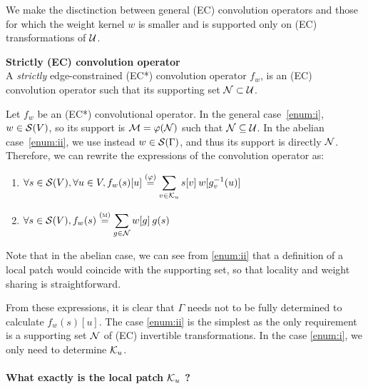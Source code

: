 We make the disctinction between general (EC) convolution operators and those for which the weight kernel $w$ is smaller and is supported only on (EC) transformations of $\cu$.

\begin{definition}\textbf{Strictly (EC) convolution operator}\\
A \emph{strictly} edge-constrained (EC*) convolution operator $f_w$, is an (EC) convolution operator such that its supporting set $\cn \subset \cu$.
\end{definition}

Let $f_w$ be an (EC*) convolutional operator. In the general case~\ref{enum:i}, $w \in \cs(V)$, so its support is $\cm = \varphi(\cn)$ such that $\cn \subseteq \cu$. In the abelian case~\ref{enum:ii}, we use instead $w \in \cs(\Gamma)$, and thus its support is directly $\cn$.
Therefore, we can rewrite the expressions of the convolution operator as:
\begin{enumerate}[label=(\roman*)]
  \item $\forall s \in \cs(V), \forall u \in V, f_w(s)[u]
          \overset{(\varphi)}= \displaystyle\sum_{v \in \ck_u} s[v] \h{2} w[g_v^{-1}(u)]$ \label{enum:i}
  \item $\forall s \in \cs(V), f_w(s) \overset{(\M)}= \displaystyle\sum_{g \in \cn} w[g] \h{2} g(s)$ \label{enum:ii}
\end{enumerate}

\begin{remark}
Note that in the abelian case, we can see from \ref{enum:ii} that a definition of a local patch would coincide with the supporting set, so that locality and weight sharing is straightforward.
\end{remark}

From these expressions, it is clear that $\Gamma$ needs not to be fully determined to calculate $f_w(s)[u]$. The case \ref{enum:ii} is the simplest as the only requirement is a supporting set $\cn$ of (EC) invertible transformations. In the case \ref{enum:i}, we only need to determine $\ck_u$.

\paragraph{What exactly is the local patch $\ck_u$ ?}




